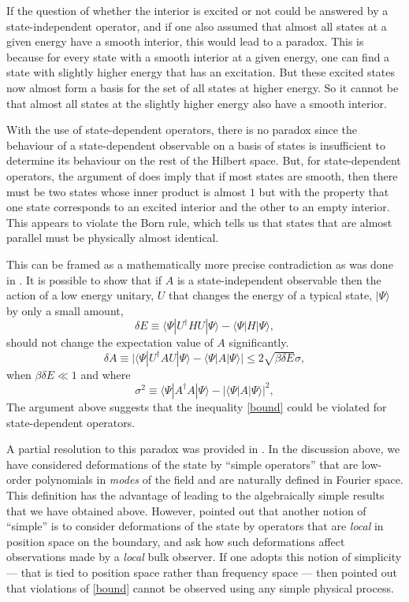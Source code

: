 \documentclass[12pt]{article}
\newcommand{\cop}[1]{#1}
\newcommand{\al}{\cop{A}} %
\newcommand{\be}{\begin{equation}}
\newcommand{\ee}{\end{equation}}
\begin{document}
If the question of whether the interior is excited or not could be answered by a state-independent operator, and if one also assumed that almost all states at a given energy have a smooth interior, this would lead to a paradox.
This is because for every state with a smooth interior at a given energy, one can find a state with slightly higher energy that has an excitation. But these excited states now almost form a basis for the set of all states at higher energy. So it cannot be that almost all states at the slightly higher energy also have a smooth interior. 

With the use of state-dependent operators, there is no paradox since the behaviour of a state-dependent observable on a basis of states is insufficient to determine its behaviour on the rest of the Hilbert space. But, for state-dependent operators, the argument of \cite{Marolf:2015dia} does imply that if most states are smooth,  then there must be two states whose inner product is almost $1$ but with the property that one state corresponds to an excited interior and the other to an empty interior. This appears to violate the Born rule, which tells us that states that are almost parallel must be physically almost identical.

This can be framed as a mathematically more precise contradiction as was done in \cite{Raju:2016vsu}. It is possible to show that if $\al$ is a state-independent observable then the action of a low energy unitary, $U$ that changes the energy of a typical state, $|\Psi \rangle$ by only a small amount,
\be
\delta E \equiv \langle \Psi | U^{\dagger} H U |\Psi \rangle - \langle \Psi | H | \Psi \rangle, 
\ee
should not change the expectation value of $\al$ significantly.
\be
\label{bound}
\delta  \al  \equiv \big|\langle \Psi | U^{\dagger} \al U |\Psi \rangle - \langle \Psi | \al |\Psi \rangle \big| \leq 2 \sqrt{\beta \delta E} \sigma,
\ee
when $\beta \delta E \ll 1$ and where 
\be
\label{sigmadef}
\sigma^2 \equiv \langle \Psi| \al^{\dagger} \al | \Psi \rangle   - \left| \langle \Psi | \al | \Psi \rangle \right|^2,
\ee
The argument above suggests that the inequality \eqref{bound} could be violated for state-dependent operators. 


A partial resolution to this paradox was provided in \cite{Raju:2016vsu}. In the discussion above, we have considered  deformations of the state by  ``simple operators'' that are low-order polynomials in {\em modes} of the field and are naturally defined in Fourier space. This definition has the advantage of leading to the algebraically simple results that we have obtained above.  However, \cite{Raju:2016vsu} pointed out that another notion of  ``simple'' is to consider deformations of the state by operators that are {\em local} in position space on the boundary, and ask how such deformations affect observations made by a {\em local} bulk observer. If one adopts this notion of simplicity --- that is tied to position space rather than frequency space ---  then \cite{Raju:2016vsu} pointed out that violations of \eqref{bound} cannot be observed using any simple physical process. 
\end{document}
